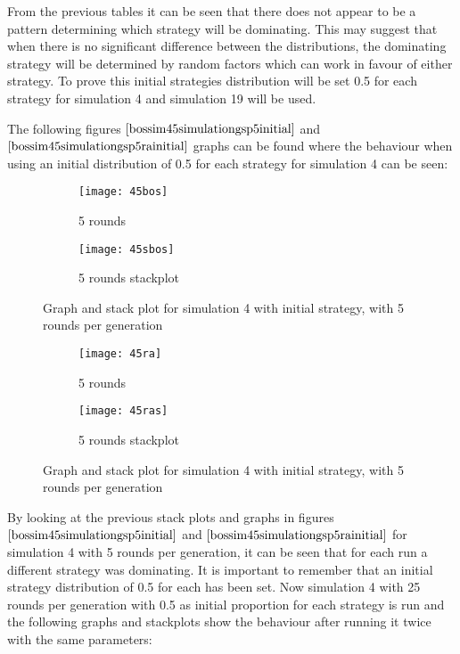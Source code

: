 From the previous tables it can be seen that there does not appear to be a pattern determining which strategy will be dominating. This may suggest that when there is no significant difference between the distributions, the dominating strategy will be determined by random factors which can work in favour of either strategy. To prove this initial strategies distribution will be set 0.5 for each strategy for simulation 4 and simulation 19 will be used.

The following figures $\ref{bossim45simulationgsp5initial}$ and $\ref{bossim45simulationgsp5rainitial}$ graphs can be found where the behaviour when using an initial distribution of 0.5 for each strategy for simulation 4 can be seen:

\begin{figure}[H]       
    \centering
    \begin{subfigure}[b]{0.3\textwidth}
	\centering
	{\texttt{[image: 45bos]}}   
    	\caption{5 rounds}
	\label{fig:bossim45bos}
    \end{subfigure}
    \hfill
    \begin{subfigure}[b]{0.3\textwidth}
	\centering
	{\texttt{[image: 45sbos]}}   
    	\caption{5 rounds stackplot}
	\label{fig:bossim45sbos}
    \end{subfigure}
    \caption{Graph and stack plot for simulation 4 with initial strategy, with 5 rounds per generation}
    \label{bossim45simulationgsp5initial}
\end{figure}

\begin{figure}[H]       
    \centering
    \begin{subfigure}[b]{0.3\textwidth}
	\centering
	{\texttt{[image: 45ra]}}   
    	\caption{5 rounds}
	\label{fig:bossim45ra}
    \end{subfigure}
    \hfill
    \begin{subfigure}[b]{0.3\textwidth}
	\centering
	{\texttt{[image: 45ras]}}   
    	\caption{5 rounds stackplot}
	\label{fig:bossim45ras}
    \end{subfigure}
    \caption{Graph and stack plot for simulation 4 with initial strategy, with 5 rounds per generation}
    \label{bossim45simulationgsp5rainitial}
\end{figure}

By looking at the previous stack plots and graphs in figures $\ref{bossim45simulationgsp5initial}$ and $\ref{bossim45simulationgsp5rainitial}$ for simulation 4 with 5 rounds per generation, it can be seen that for each run a different strategy was dominating. It is important to remember that an initial strategy distribution of 0.5 for each has been set.
Now simulation 4 with 25 rounds per generation with 0.5 as initial proportion for each strategy is run and the following graphs and stackplots show the behaviour after running it twice with the same parameters:

